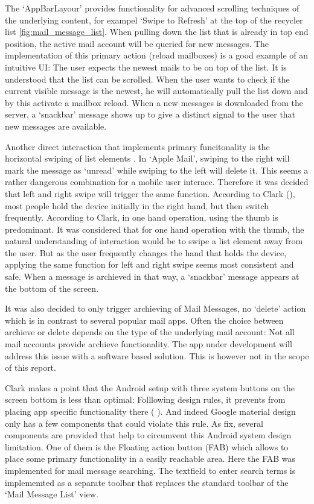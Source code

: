 \documentclass[a4paper,11pt,twoside]{article}
\begin{document}
The `AppBarLayour' provides functionality for advanced scrolling techniques of
the underlying content, for exampel `Swipe to Refresh' at the top of the
recycler list \ref{fig:mail_message_list}. When pulling down the list that is
already in top end position, the active mail account will be queried for new
messages. The implementation of this primary action (reload mailboxes) is a good
example of an intuitive UI: The user expects the newest mails to be on top of
the list. It is understood that the list can be scrolled. When the user wants to
check if the current visible message is the newest, he will automatically pull
the list down and by this activate a mailbox reload. When a new messages is
downloaded from the server, a `snackbar' message shows up to give a distinct
signal to the user that new messages are available.

Another direct interaction that implements primary funcitonality is the
horizontal swiping of list elements
\cite['Leave-behinds']{material_list_controls}. In `Apple Mail', swiping to the
right will mark the message as `unread' while swiping to the left will delete
it. This seems a rather dangerous combination for a mobile user interace.
Therefore it was decided that left and right swipe will trigger the same
function. According to Clark (\cite[chapter1, `Hold the phone']{clark2015}),
most people hold the device initially in the right hand, but then switch
frequently. According to Clark, in one hand operation, using the thumb is
predominant. It was considered  that for one hand operation with the thumb, the
natural understanding of interaction would be to swipe a list element away from
the user. But as the user frequently changes the hand that holds the device,
applying the same function for left and right swipe seems most consistent and
safe. When a message is archieved in that way, a `snackbar' message appears at
the bottom of the screen.

It was also decided to only trigger archieving of Mail Messages, no `delete'
action  which is in contrast to several popular mail apps. Often the choice
between archieve  or delete depends on the type of the underlying mail account:
Not all mail accounts provide archieve functionality. The app under development
will address this issue with a software based solution. This is however not
in the scope of this report.

Clark makes a point that the Android setup with three system buttons on the
screen bottom is less than optimal: Folllowing design rules, it prevents from
placing app specific functionality there  (
\cite[Chapter 1, 'Make Way for the Operating System']{clark2015}).
And indeed Google material design only  has a
few components that could violate this rule. As fix, several components are
provided that help to circumvent this Android system design limitation. One of
them is the Floating action button (FAB) which allows to place some primary
functionality in a easily reachable area. Here the FAB was implemented for mail
message searching. The textfield to enter search terms is implememted as
a separate toolbar that replaces the standard toolbar of the `Mail Message List'
view.
\end{document}
